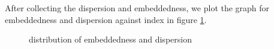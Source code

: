 \documentclass{article}
\begin{document}
After collecting the dispersion and embeddedness, we plot the graph for embeddedness and dispersion against index in figure \ref{fig:p5_34}.\\
\begin{figure}[htbp]
\centering
{}
\caption{distribution of embeddedness and dispersion}
\label{fig:p5_34}
\end{figure}
\end{document}

